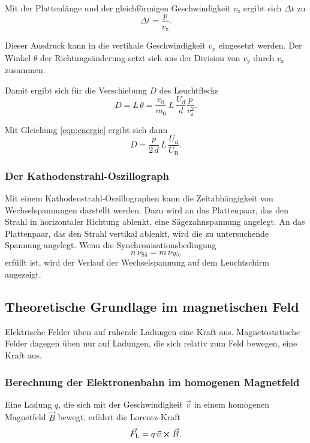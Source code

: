 \noindent Mit der Plattenlänge und der 
gleichförmigen Geschwindigkeit $v_\text{z}$ ergibt sich $\Delta t$ zu
\begin{equation*}
    \Delta t = \frac{p}{v_\text{z}}.
\end{equation*}

\noindent Dieser Ausdruck kann in die vertikale 
Geschwindigkeit $v_\text{y}$ eingesetzt werden. Der Winkel $\theta$ der 
Richtungsänderung setzt sich aus der Division von 
$v_\text{y}$ durch $v_\text{z}$ zusammen. 

\noindent Damit ergibt sich für die Verschiebung $D$ des Leuchtflecks 
\begin{equation*}
    D = L \, \theta = \frac{e_\text{0}}{m_\text{0}} \, L \, \frac{U_\text{d}}{d} \frac{p}{v_\text{z}^2}.
\end{equation*}

\noindent Mit Gleichung \eqref{eqn:energie} ergibt sich dann 
\begin{equation}
    D = \frac{p}{2\, d} \, L \, \frac{U_\text{d}}{U_\text{B}}.
    \label{eqn:leuchtfleck}
\end{equation}

\subsubsection{Der Kathodenstrahl-Oszillograph}
Mit einem Kathodenstrahl-Oszillographen kann die Zeitabhängigkeit
von Wechselspannungen darstellt werden.
Dazu wird an das Plattenpaar, das den Strahl in horizontaler
Richtung ablenkt, eine Sägezahnspannung angelegt. An das Plattenpaar,
das den Strahl vertikal ablenkt, wird die zu untersuchende
Spannung angelegt. Wenn die Synchronisationsbedingung
\begin{equation*}
    n \, \nu_\text{Sä} = m \, \nu_\text{We}
\end{equation*}
erfüllt ist, wird der Verlauf der Wechselspannung auf dem
Leuchtschirm angezeigt.


\subsection{Theoretische Grundlage im magnetischen Feld}
Elektrische Felder üben auf ruhende Ladungen 
eine Kraft aus. Magnetostatische Felder dagegen üben nur auf 
Ladungen, die sich relativ zum Feld bewegen, eine Kraft aus.

\subsubsection{Berechnung der Elektronenbahn im homogenen Magnetfeld}
Eine Ladung $q$, die sich mit der Geschwindigkeit $\vec{v}$ in 
einem homogenen Magnetfeld $\vec{B}$ bewegt, erfährt die Lorentz-Kraft 
\begin{equation}
    \vec{F_\text{L}}= q \, \vec{v} \cross \vec{B}.
    \label{eqn:Lorentz}
\end{equation}

